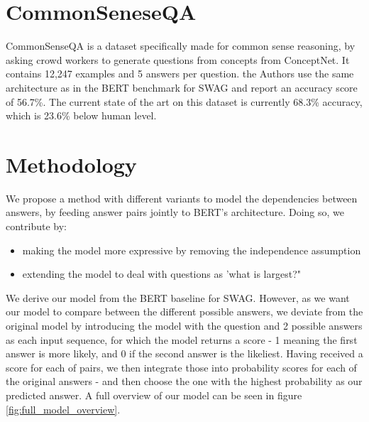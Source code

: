 \documentclass{article}
\begin{document}

\section{CommonSeneseQA}
CommonSenseQA is a dataset specifically made for common sense reasoning, by asking crowd workers to generate questions from concepts from ConceptNet. It contains 12,247 examples and 5 answers per question. 
the Authors use the same architecture as in the BERT benchmark for SWAG and report an accuracy score of 56.7\%. The current state of the art on this dataset is currently 68.3\% accuracy, which is 23.6\% below human level.

\section{Methodology}
We propose a method with different variants to model the dependencies between answers, by feeding answer pairs jointly to BERT's architecture. Doing so, we contribute by:

\begin{itemize}
\item making the model more expressive by removing the independence assumption
\item extending the model to deal with questions as 'what is largest?"
\end{itemize}

We derive our model from the BERT baseline for SWAG. However, as we want our model to compare between the different possible answers, we deviate from the original model by introducing the model with the question and 2 possible answers as each input sequence, for which the model returns a score - 1 meaning the first answer is more likely, and 0 if the second answer is the likeliest. Having received a score for each of pairs, we then integrate those into probability scores for each of the original answers - and then choose the one with the highest probability as our predicted answer. A full overview of our model can be seen in figure \ref{fig:full_model_overview}.

\end{document}
